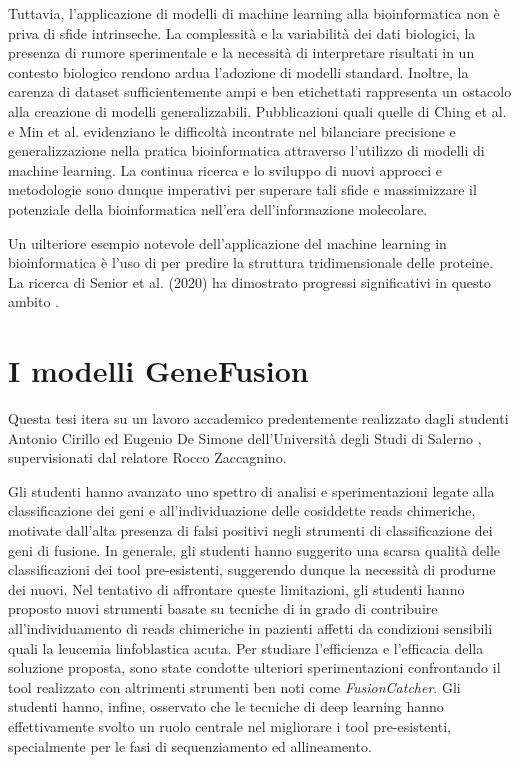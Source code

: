 Tuttavia, l'applicazione di modelli di machine learning alla bioinformatica non è priva di sfide intrinseche. La complessità e la variabilità dei dati biologici, la presenza di rumore sperimentale e la necessità di interpretare risultati in un contesto biologico rendono ardua l'adozione di modelli standard. Inoltre, la carenza di dataset sufficientemente ampi e ben etichettati rappresenta un ostacolo alla creazione di modelli generalizzabili. Pubblicazioni quali quelle di Ching et al. \cite{ching2018deep} e Min et al. \cite{min2017deep} evidenziano le difficoltà incontrate nel bilanciare precisione e generalizzazione nella pratica bioinformatica attraverso l'utilizzo di modelli di machine learning. La continua ricerca e lo sviluppo di nuovi approcci e metodologie sono dunque imperativi per superare tali sfide e massimizzare il potenziale della bioinformatica nell'era dell'informazione molecolare.

Un uilteriore esempio notevole dell'applicazione del machine learning in bioinformatica è l'uso di  per predire la struttura tridimensionale delle proteine. La ricerca di Senior et al. (2020) ha dimostrato progressi significativi in questo ambito \cite{senior2020improved}.

\section{I modelli GeneFusion}

Questa tesi itera su un lavoro accademico predentemente realizzato dagli studenti Antonio Cirillo ed Eugenio De Simone dell'Università degli Studi di Salerno \cite{cirillo} \cite{desimone}, supervisionati dal relatore Rocco Zaccagnino.

Gli studenti hanno avanzato uno spettro di analisi e sperimentazioni legate alla classificazione dei geni e all'individuazione delle cosiddette reads chimeriche, motivate dall'alta presenza di falsi positivi negli strumenti di classificazione dei geni di fusione. In generale, gli studenti hanno suggerito una scarsa qualità delle classificazioni dei tool pre-esistenti, suggerendo dunque la necessità di produrne dei nuovi. Nel tentativo di affrontare queste limitazioni, gli studenti hanno proposto nuovi strumenti basate su tecniche di  in grado di contribuire all'individuamento di reads chimeriche in pazienti affetti da condizioni sensibili quali la leucemia linfoblastica acuta. Per studiare l'efficienza e l'efficacia della soluzione proposta, sono state condotte ulteriori sperimentazioni confrontando il tool realizzato con altrimenti strumenti ben noti come {\em FusionCatcher}. Gli studenti hanno, infine, osservato che le tecniche di deep learning hanno effettivamente svolto un ruolo centrale nel migliorare i tool pre-esistenti, specialmente per le fasi di sequenziamento ed allineamento.

